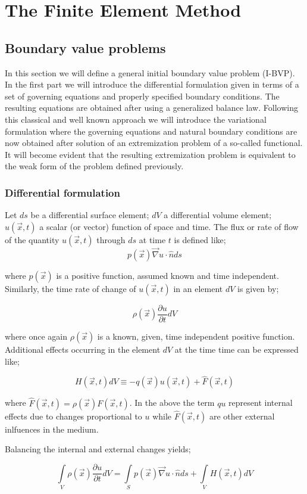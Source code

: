 \chapter{The Finite Element Method}
\section{Boundary value problems}
In this section we will define a general initial boundary value problem (I-BVP). In the first part we will introduce the differential formulation given in terms of a set of governing equations and properly specified boundary conditions. The resulting equations are obtained after using a generalized balance law. Following this classical and well known approach we will introduce the variational formulation where the governing equations and natural boundary conditions are now obtained after solution of an extremization problem of a so-called functional. It will become evident that the resulting extremization problem is equivalent to the weak form of the problem defined previously.
\subsection{Differential formulation}
Let $ds$ be a differential surface element; $dV$ a differential volume element; $u(\vec x,t)$ a scalar (or vector) function of space and time.
The flux or rate of flow of the quantity $u(\vec x,t)$ through $ds$ at time $t$ is defined like;
\[p(\vec x)\vec \nabla u \cdot \hat nds\]

where $p(\vec x)$ is a positive function, assumed known and time independent. Similarly, the time rate of change of $u(\vec x,t)$ in an element $dV$ is given by;

\[\rho (\vec x)\frac{{\partial u}}{{\partial t}}dV\]

where once again $\rho (\vec x)$ is a known, given, time independent positive function. Additional effects occurring in the element $dV$ at the time time can be expressed like;

\[H(\vec x,t)dV \equiv  - q(\vec x)u(\vec x,t) + \hat F(\vec x,t)\]

where $\hat F(\vec x,t) = \rho (\vec x)F(\vec x,t)$. In the above the term $qu$ represent internal effects due to changes proportional to $u$ while $\hat F(\vec x,t)$ are other external inlfuences in the medium.

Balancing the internal and external changes yields;

\[\int\limits_V {\rho (\vec x)\frac{{\partial u}}{{\partial t}}dV = \int\limits_S {p(\vec x)\vec \nabla u \cdot \hat nds} }  + \int\limits_V {H(\vec x,t)dV} \]

